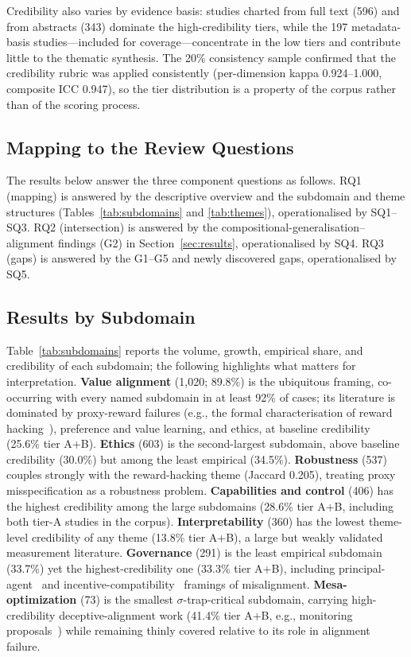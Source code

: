Credibility also varies by evidence basis: studies charted from full text (596) and from abstracts (343) dominate the high-credibility tiers, while the 197 metadata-basis studies---included for coverage---concentrate in the low tiers and contribute little to the thematic synthesis. The 20\% consistency sample confirmed that the credibility rubric was applied consistently (per-dimension kappa 0.924--1.000, composite ICC 0.947), so the tier distribution is a property of the corpus rather than of the scoring process.

\subsection{Mapping to the Review Questions}
The results below answer the three component questions as follows. RQ1 (mapping) is answered by the descriptive overview and the subdomain and theme structures (Tables~\ref{tab:subdomains} and \ref{tab:themes}), operationalised by SQ1--SQ3. RQ2 (intersection) is answered by the compositional-generalisation--alignment findings (G2) in Section~\ref{sec:results}, operationalised by SQ4. RQ3 (gaps) is answered by the G1--G5 and newly discovered gaps, operationalised by SQ5.

\subsection{Results by Subdomain}
Table~\ref{tab:subdomains} reports the volume, growth, empirical share, and credibility of each subdomain; the following highlights what matters for interpretation. \textbf{Value alignment} (1,020; 89.8\%) is the ubiquitous framing, co-occurring with every named subdomain in at least 92\% of cases; its literature is dominated by proxy-reward failures (e.g., the formal characterisation of reward hacking~\cite{P688}), preference and value learning, and ethics, at baseline credibility (25.6\% tier A+B). \textbf{Ethics} (603) is the second-largest subdomain, above baseline credibility (30.0\%) but among the least empirical (34.5\%). \textbf{Robustness} (537) couples strongly with the reward-hacking theme (Jaccard 0.205), treating proxy misspecification as a robustness problem. \textbf{Capabilities and control} (406) has the highest credibility among the large subdomains (28.6\% tier A+B, including both tier-A studies in the corpus). \textbf{Interpretability} (360) has the lowest theme-level credibility of any theme (13.8\% tier A+B), a large but weakly validated measurement literature. \textbf{Governance} (291) is the least empirical subdomain (33.7\%) yet the highest-credibility one (33.3\% tier A+B), including principal-agent~\cite{P007} and incentive-compatibility~\cite{P128} framings of misalignment. \textbf{Mesa-optimization} (73) is the smallest $\sigma$-trap-critical subdomain, carrying high-credibility deceptive-alignment work (41.4\% tier A+B, e.g., monitoring proposals~\cite{P1097}) while remaining thinly covered relative to its role in alignment failure.

